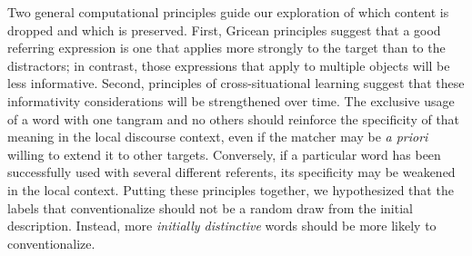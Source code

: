 \documentclass[alpha-refs]{wiley-article}
\begin{document}
Two general computational principles guide our exploration of which content is dropped and which is preserved.
First, Gricean principles suggest that a good referring expression is one that applies more strongly to the target than to the distractors; in contrast, those expressions that apply to multiple objects will be less informative.
Second, principles of cross-situational learning suggest that these informativity considerations will be strengthened over time.
The exclusive usage of a word with one tangram and no others should reinforce the specificity of that meaning in the local discourse context, even if the matcher may be \emph{a priori} willing to extend it to other targets.
Conversely, if a particular word has been successfully used with several different referents, its specificity may be weakened in the local context.
Putting these principles together, we hypothesized that the labels that conventionalize should not be a random draw from the initial description.
Instead, more \emph{initially distinctive} words should be more likely to conventionalize.
\end{document}
